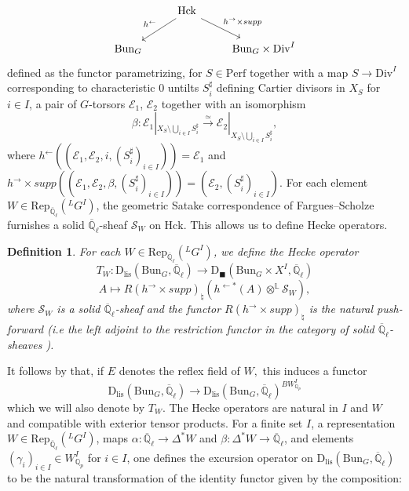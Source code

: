 \documentclass[reqno,11pt]{amsart}
\newtheorem{definition}[theorem]{Definition}
\theoremstyle{remark}
\newcommand{\Bun}{\mathrm{Bun}}
\newcommand{\Rep}{\mathrm{Rep}}
\newcommand{\Dc}{\mathrm{D}}
\newcommand{\Dlis}{\mathrm{D}_{\mathrm{lis}}}
\newcommand{\Perf}{\mathrm{Perf}}
\def\ol{\overline}
\def\Div{\mathrm{Div}}
\begin{document}
\[ \begin{tikzcd}
& & \arrow[dl, swap, "h^{\leftarrow}"] \mathrm{Hck} \arrow[dr,"h^{\rightarrow} \times supp"] & & \\
& \Bun_{G} & & \Bun_{G} \times \Div^{I}  & 
\end{tikzcd} \]
defined as the functor parametrizing, for $S \in \Perf$ together with a map $S \rightarrow \Div^{I}$ corresponding to characteristic $0$ untilts $S_{i}^{\sharp}$ defining Cartier divisors in $X_{S}$ for $i \in I$, a pair of $G$-torsors $\mathcal{E}_{1}$, $\mathcal{E}_{2}$ together with an isomorphism
\[ \beta:\mathcal{E}_{1}|_{X_{S} \setminus \bigcup_{i \in I} S_{i}^{\sharp}} \xrightarrow{\simeq} \mathcal{E}_{2}|_{X_{S} \setminus \bigcup_{i \in I} S_{i}^{\sharp}},\]
where $h^{\leftarrow}((\mathcal{E}_{1},\mathcal{E}_{2},i,(S_{i}^{\sharp})_{i \in I})) = \mathcal{E}_{1}$ and $h^{\rightarrow} \times supp((\mathcal{E}_{1},\mathcal{E}_{2},\beta,(S_{i}^{\sharp})_{i \in I})) = (\mathcal{E}_{2},(S_{i}^{\sharp})_{i \in I})$. For each element $W \in \Rep_{\overline{\mathbb{Q}}_{\ell}}(^{L}G^{I})$, the geometric Satake correspondence of Fargues--Scholze \cite[Chapter~VI]{FS} furnishes a solid $\overline{\mathbb{Q}}_{\ell}$-sheaf $\mathcal{S}_{W}$ on $\mathrm{Hck}$. This allows us to define Hecke operators.
\begin{definition}
For each $W \in \Rep_{\overline{\mathbb{Q}}_{\ell}}(\phantom{}^{L}G^{I})$, we define the Hecke operator
\[ T_{W}: \Dlis(\Bun_{G},\overline{\mathbb{Q}}_{\ell}) \rightarrow \Dc_{\blacksquare}(\Bun_{G} \times X^{I},\ol{\mathbb{Q}}_{\ell}) \]
\[ A \mapsto R(h^{\rightarrow} \times supp)_{\natural}(h^{\leftarrow *}(A) \otimes^{\mathbb{L}} \mathcal{S}_{W}),\]
where $\mathcal{S}_{W}$ is a solid $\overline{\mathbb{Q}}_{\ell}$-sheaf and the functor $R(h^{\rightarrow} \times supp)_{\natural}$ is the natural push-forward (i.e the left adjoint to the restriction functor in the category of solid $\overline{\mathbb{Q}}_{\ell}$-sheaves \cite[Proposition~VII.3.1]{FS}). 
\end{definition}
It follows by 
\cite[Theorem~I.7.2, Proposition~IX.2.1, Corollary~IX.2.3]{FS} that, if $E$ denotes the reflex field of $W,$ this induces a functor 
\[ \Dlis(\Bun_{G},\overline{\mathbb{Q}}_{\ell}) \rightarrow \Dlis(\Bun_{G},\overline{\mathbb{Q}}_{\ell})^{BW_{\mathbb{Q}_{p}}^{I}} \]
which we will also denote by $T_{W}$. The Hecke operators are natural in $I$ and $W$ and compatible with exterior tensor products. For a finite set $I$, a representation $W \in \Rep_{\overline{\mathbb{Q}}_{\ell}}(\phantom{}^LG^{I})$, maps $\alpha: \overline{\mathbb{Q}}_{\ell} \rightarrow \Delta^{*}W$ and $\beta: \Delta^{*}W \rightarrow \overline{\mathbb{Q}}_{\ell}$, and elements $(\gamma_{i})_{i \in I} \in W_{\mathbb{Q}_{p}}^{I}$ for $i \in  I$, one defines the excursion operator on $\Dlis(\Bun_{G},\overline{\mathbb{Q}}_{\ell})$ to be the natural transformation of the identity functor given by the composition:
\end{document}

